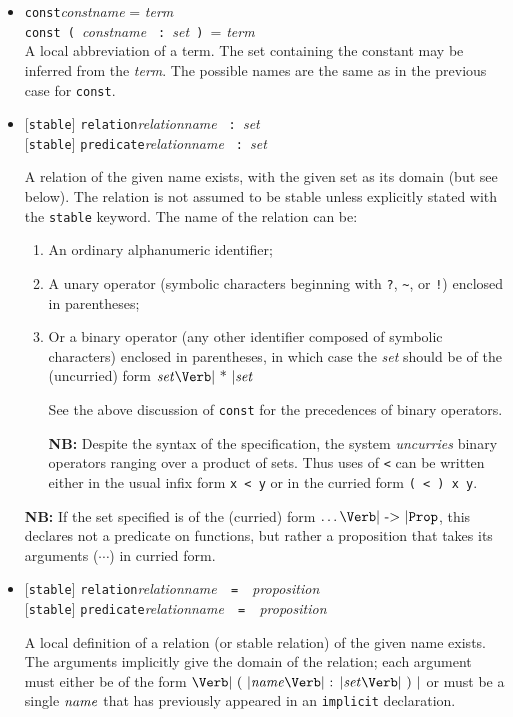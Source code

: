 \documentclass[11pt]{article}
\newcommand{\keywd}[1]{\mbox{\texttt{#1}}\xspace}
\newcommand{\CONST}{\keywd{const}}
\newcommand{\IMPLICIT}{\keywd{implicit}}
\newcommand{\PROP}{\keywd{Prop}}
\newcommand{\PREDICATE}{\keywd{predicate}}
\newcommand{\RELATION}{\keywd{relation}}
\newcommand{\STABLE}{\keywd{stable}}
\newcommand{\metav}[1]{\mbox{\textit{#1}}\xspace}
\newcommand{\Ident}{\metav{name}}
\newcommand{\Identifier}{\Ident}
\newcommand{\Setexp}{\metav{set}}
\newcommand{\Proposition}{\metav{proposition}}
\newcommand{\Term}{\metav{term}}
\newcommand{\COLON}{\mbox{\Verb| : |}}
\newcommand{\EQUALS}{\mbox{\Verb| = |}}
\newcommand{\LPAREN}{\mbox{\Verb| ( |}}
\newcommand{\RPAREN}{\mbox{\Verb| ) |}}
\newcommand{\TIMES}{\mbox{\Verb| * |}}
\newcommand{\TO}{\mbox{\Verb| -> |}}
\newcommand{\NB}{\textbf{NB: }}
\begin{document}
\begin{itemize}
\item \CONST \metav{constname} = \Term\\
      \CONST \LPAREN \metav{constname} \COLON \Setexp \RPAREN = \Term\\
      
      A local abbreviation of a term.  The set containing the constant
      may be inferred from the \Term.  The possible names are the same
      as in the previous case for \CONST.

\item{} [\STABLE{}] \RELATION \metav{relationname} \COLON \Setexp\\
     {} [\STABLE{}] \PREDICATE \metav{relationname} \COLON \Setexp
  
     A relation of the given name exists, with the given set as its
     domain (but see below).  The relation is not assumed to be stable
     unless explicitly stated with the \STABLE keyword.  The name of
     the relation can be:
\begin{enumerate}
\item  An ordinary alphanumeric identifier;
\item  A unary operator (symbolic characters beginning with \Verb|?|, \Verb|~|, or \Verb|!|) enclosed in parentheses;
\item  Or a binary operator (any other identifier composed of symbolic characters) enclosed in parentheses, in which case the \Setexp should be of the (uncurried) form $\Setexp \TIMES \Setexp$

See the above discussion of \CONST for the precedences of binary
operators.

\NB Despite the syntax of the specification, the system \emph{uncurries}
binary operators ranging over a product of sets.  Thus uses of
\Verb|<| can be written either in the usual infix form \Verb|x < y| or
in the curried form \Verb|( < ) x y|.
\end{enumerate}

\NB If the set specified is of the (curried) form $\ldots \TO \PROP$,
this declares not a predicate on functions, but rather a proposition
that takes its arguments ($\cdots$) in curried form.

\item{} [\STABLE{}] \RELATION \metav{relationname}\ \EQUALS\ \Proposition\\
     {} [\STABLE{}] \PREDICATE \metav{relationname}\ \EQUALS\ \Proposition
  
     A local definition of a relation (or stable relation) of the
     given name exists.  The arguments implicitly give the domain of
     the relation; each argument must either be of the form $\LPAREN
     \Identifier \COLON \Setexp \RPAREN$ or must be a single
     $\Identifier$ that has previously appeared in an \IMPLICIT
     declaration.



\end{itemize}
\end{document}
